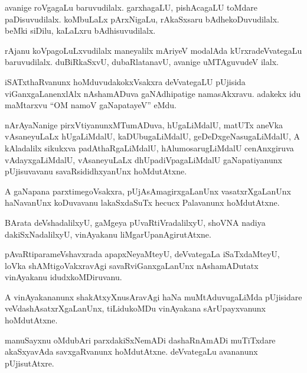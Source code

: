 \documentclass{article}
\begin{document}
\begin{mng}%
avanige roVgagaLu baruvudilalx. garxhagaLU, pishAcagaLU toMdare paDisuvudilalx. koMbuLaLx pArxNigaLu, rAkaSxsaru bAdhekoDuvudilalx. beMki siDilu, kaLaLxru bAdhisuvudilalx.
\end{mng}

\begin{mng}%
rAjanu koVpagoLuLxvudilalx maneyalilx mAriyeV modalAda kUrxradeVvategaLu baruvudilalx. duBiRkaSxvU, dubaRlatanavU, avanige uMTAguvudeV ilalx.
\end{mng}

\begin{mng}%
iSATxthaRvanunx hoMduvudakokxVsakxra deVvategaLU pUjisida viGanxgaLanenxlAlx nAshamADuva gaNAdhipatige namasAkxravu. adakekx idu maMtarxvu ``OM namoV gaNapatayeV'' eMdu.
\end{mng}

\begin{mng}%
nArAyaNanige pirxVtiyanunxMTumADuva, hUgaLiMdalU, matUTx aneVka vAsaneyuLaLx hUgaLiMdalU, kaDUbugaLiMdalU, geDeDxgeNasugaLiMdalU, A kAladalilx sikukxva padAthaRgaLiMdalU, hAlumosarugLiMdalU cenAnxgiruva vAdayxgaLiMdalU, vAsaneyuLaLx dhUpadiVpagaLiMdalU gaNapatiyanunx pUjisuvavanu savaRsididhxyanUnx hoMdutAtxne.
\end{mng}

\begin{mng}%
A gaNapana parxtimegoVsakxra, pUjAsAmagirxgaLanUnx vasatxrXgaLanUnx haNavanUnx koDuvavanu lakaSxdaSuTx hecucx Palavanunx hoMdutAtxne.
\end{mng}

\begin{mng}%
BArata deVshadalilxyU, gaMgeya pUvaRtiVradalilxyU, shoVNA nadiya dakiSxNadalilxyU, vinAyakanu liMgarUpanAgirutAtxne.
\end{mng}

\begin{mng}%
pAvaRtiparameVshavxrada apapxNeyaMteyU, deVvategaLa iSaTxdaMteyU, loVka shAMtigoVakxravAgi savaRviGanxgaLanUnx nAshamADutatx vinAyakanu idudxkoMDiruvanu.
\end{mng}

\begin{mng}%
A vinAyakananunx shakAtxyXnusAravAgi haNa muMtAduvugaLiMda pUjisidare veVdashAsatxrXgaLanUnx, tiLidukoMDu vinAyakana sArUpayxvanunx hoMdutAtxne.
\end{mng}

\begin{mng}%
manuSayxnu oMdubAri parxdakiSxNemADi dashaRnAmADi muTiTxdare akaSxyavAda savxgaRvanunx hoMdutAtxne. deVvategaLu avananunx pUjisutAtxre.
\end{mng}
\end{document}
